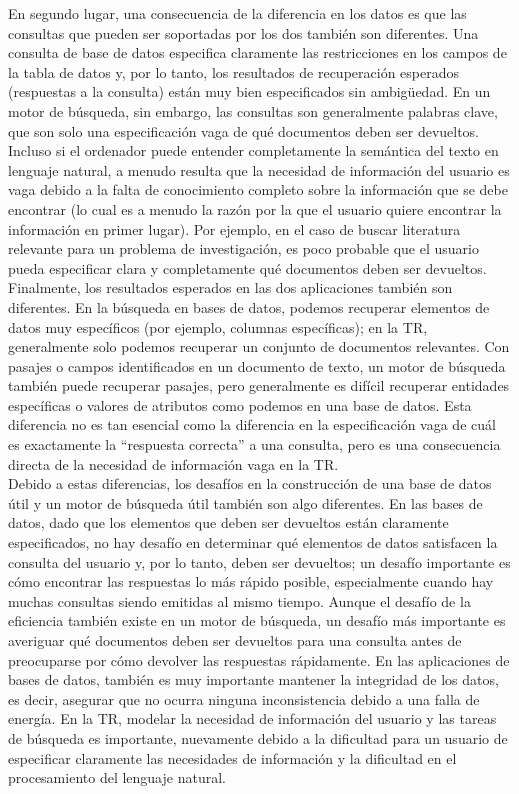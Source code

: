En segundo lugar, una consecuencia de la diferencia en los datos es que las consultas que pueden ser soportadas por los dos también son diferentes. Una consulta de base de datos especifica claramente las restricciones en los campos de la tabla de datos y, por lo tanto, los resultados de recuperación esperados (respuestas a la consulta) están muy bien especificados sin ambigüedad. En un motor de búsqueda, sin embargo, las consultas son generalmente palabras clave, que son solo una especificación vaga de qué documentos deben ser devueltos. Incluso si el ordenador puede entender completamente la semántica del texto en lenguaje natural, a menudo resulta que la necesidad de información del usuario es vaga debido a la falta de conocimiento completo sobre la información que se debe encontrar (lo cual es a menudo la razón por la que el usuario quiere encontrar la información en primer lugar). Por ejemplo, en el caso de buscar literatura relevante para un problema de investigación, es poco probable que el usuario pueda especificar clara y completamente qué documentos deben ser devueltos. \\

Finalmente, los resultados esperados en las dos aplicaciones también son diferentes. En la búsqueda en bases de datos, podemos recuperar elementos de datos muy específicos (por ejemplo, columnas específicas); en la TR, generalmente solo podemos recuperar un conjunto de documentos relevantes. Con pasajes o campos identificados en un documento de texto, un motor de búsqueda también puede recuperar pasajes, pero generalmente es difícil recuperar entidades específicas o valores de atributos como podemos en una base de datos. Esta diferencia no es tan esencial como la diferencia en la especificación vaga de cuál es exactamente la ``respuesta correcta'' a una consulta, pero es una consecuencia directa de la necesidad de información vaga en la TR. \\

Debido a estas diferencias, los desafíos en la construcción de una base de datos útil y un motor de búsqueda útil también son algo diferentes. En las bases de datos, dado que los elementos que deben ser devueltos están claramente especificados, no hay desafío en determinar qué elementos de datos satisfacen la consulta del usuario y, por lo tanto, deben ser devueltos; un desafío importante es cómo encontrar las respuestas lo más rápido posible, especialmente cuando hay muchas consultas siendo emitidas al mismo tiempo. Aunque el desafío de la eficiencia también existe en un motor de búsqueda, un desafío más importante es averiguar qué documentos deben ser devueltos para una consulta antes de preocuparse por cómo devolver las respuestas rápidamente. En las aplicaciones de bases de datos, también es muy importante mantener la integridad de los datos, es decir, asegurar que no ocurra ninguna inconsistencia debido a una falla de energía. En la TR, modelar la necesidad de información del usuario y las tareas de búsqueda es importante, nuevamente debido a la dificultad para un usuario de especificar claramente las necesidades de información y la dificultad en el procesamiento del lenguaje natural. \\

